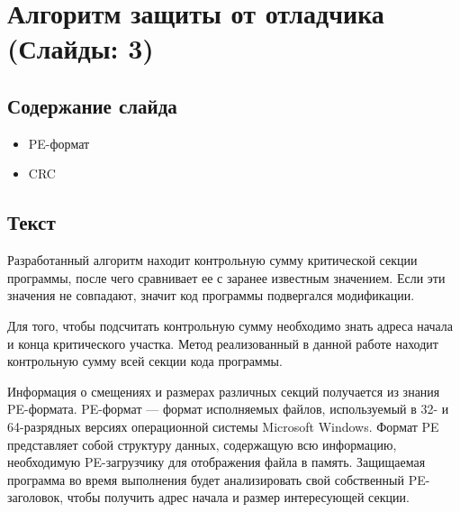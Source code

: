 
\section{Алгоритм защиты от отладчика (Слайды: 3)}

\subsection{Содержание слайда}

\begin{itemize}
  \item PE-формат
  \item CRC
\end{itemize}

\subsection{Текст}

Разработанный алгоритм находит контрольную сумму критической секции программы,
после чего сравнивает ее с заранее известным значением. Если эти значения не
совпадают, значит код программы подвергался модификации. 

Для того, чтобы подсчитать контрольную сумму необходимо знать адреса начала и
конца критического участка. Метод реализованный в данной работе находит
контрольную сумму всей секции кода программы.

Информация о смещениях и размерах различных секций получается из знания
PE-формата. PE-формат --- формат исполняемых файлов, используемый в 32- и
64-разрядных версиях операционной системы Microsoft Windows. Формат PE
представляет собой структуру данных, содержащую всю информацию, необходимую
PE-загрузчику для отображения файла в память. Защищаемая программа во время
выполнения будет анализировать свой собственный PE-заголовок, чтобы получить
адрес начала и размер интересующей секции.
